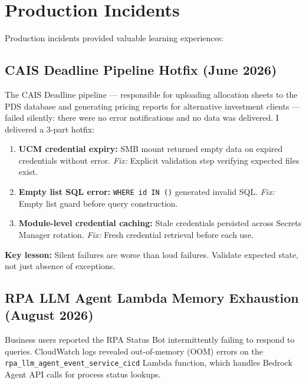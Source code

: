 \FloatBarrier

\clearpage
\section{Production Incidents}
\label{sec:challenges-incidents}


Production incidents provided valuable learning experiences:

\subsection{CAIS Deadline Pipeline Hotfix (June 2026)}

The CAIS Deadline pipeline --- responsible for uploading allocation sheets to the PDS database and generating pricing reports for alternative investment clients --- failed silently: there were no error notifications and no data was delivered. I delivered a 3-part hotfix:

\begin{enumerate}
    \item \textbf{UCM credential expiry:} SMB mount returned empty data on
          expired credentials without error. \textit{Fix:} Explicit validation
          step verifying expected files exist.

    \item \textbf{Empty list SQL error:} \texttt{WHERE id IN ()} generated
          invalid SQL. \textit{Fix:} Empty list guard before query construction.

    \item \textbf{Module-level credential caching:} Stale credentials persisted
          across Secrets Manager rotation. \textit{Fix:} Fresh credential
          retrieval before each use.
\end{enumerate}

\textbf{Key lesson:} 
Silent failures are worse than loud failures. Validate
expected state, not just absence of exceptions.

\subsection{RPA LLM Agent Lambda Memory Exhaustion (August 2026)}

Business users reported the RPA Status Bot intermittently failing to respond
to queries. CloudWatch logs revealed out-of-memory (OOM) errors on the
\texttt{rpa\_llm\_agent\_event\_service\_cicd} Lambda function, which handles
Bedrock Agent API calls for process status lookups.

